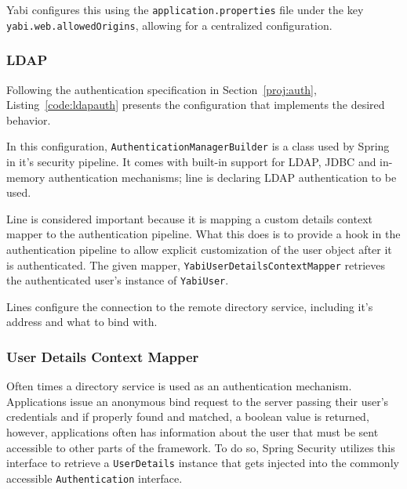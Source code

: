 \gls{Yabi} configures this using the \texttt{application.properties} file under the key \texttt{yabi.web.allowedOrigins}, allowing for a centralized configuration.

\subsubsection{\gls{LDAP}}\label{impl:ldap}

Following the authentication specification in Section~\ref{proj:auth}, Listing~\ref{code:ldapauth} presents the configuration that implements the desired behavior.



In this configuration, \texttt{AuthenticationManagerBuilder} is a class used by Spring in it's security pipeline. It comes with built-in support for \gls{LDAP}, \gls{JDBC} and in-memory authentication mechanisms; line  is declaring \gls{LDAP} authentication to be used.

Line  is considered important because it is mapping a custom details context mapper to the authentication pipeline. What this does is to provide a hook in the authentication pipeline to allow explicit customization of the user object after it is authenticated. The given mapper, \texttt{YabiUserDetailsContextMapper} retrieves the authenticated user's instance of \texttt{YabiUser}.

Lines  configure the connection to the remote directory service, including it's address and what to bind with.

\subsubsection{User Details Context Mapper}\label{impl:detailsmapper}
Often times a directory service is used as an authentication mechanism. Applications issue an anonymous bind request to the server passing their user's credentials and if properly found and matched, a boolean value is returned, however, applications often has information about the user that must be sent accessible to other parts of the framework. To do so, Spring Security utilizes this interface to retrieve a \texttt{UserDetails} instance that gets injected into the commonly accessible \texttt{Authentication} interface.

